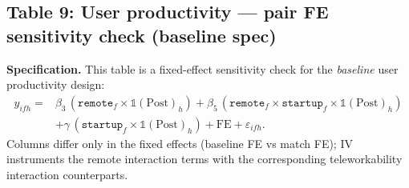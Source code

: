 \documentclass{article}
\newcommand{\cleanedresultsdir}{../../results/cleaned/tex}
\newcommand{\TableInput}[2][\linewidth]{}
\newcommand{\FloatNote}[1]{%
  \begingroup
    \captionsetup{style=noteflush}%
    \caption*{\textit{Notes:}~#1}%
  \endgroup
}
\begin{document}
\subsection*{Table 9: User productivity --- pair FE sensitivity check (baseline spec)}
\noindent \textbf{Specification.} This table is a fixed-effect sensitivity check for the \emph{baseline} user productivity design:
\begin{equation*}
\begin{aligned}
  y_{ifh} ={}&
  \beta_3\,(\texttt{remote}_f\times \mathds{1}(\text{Post})_h)
  + \beta_5\,(\texttt{remote}_f\times \texttt{startup}_f\times \mathds{1}(\text{Post})_h) \\
  &+ \gamma\,(\texttt{startup}_f\times \mathds{1}(\text{Post})_h)
  + \text{FE} + \varepsilon_{ifh}.
\end{aligned}
\end{equation*}
\noindent Columns differ only in the fixed effects (baseline FE vs match FE); IV instruments the remote interaction terms with the corresponding teleworkability interaction counterparts.
\begin{table}[H]\centering
  \caption{Pair FE sensitivity check}
  \TableInput{\cleanedresultsdir/llm_equity_pi_followups_pair_fe_quick.tex}
  \FloatNote{Columns (1)--(2) use the baseline fixed effects $\alpha_i+\alpha_f+\tau_h$ (individual, firm, half-year). Columns (3)--(4) replace individual and firm fixed effects with a firm$\times$individual fixed effect $\alpha_{if}$ plus half-year FE. ``Main remote effect'' corresponds to $\beta_3$ on $\texttt{Remote}\times\mathds{1}(\text{Post})$ (post remote effect for non-startups). ``Main startup effect'' corresponds to $\beta_5$ on $\texttt{Remote}\times\mathds{1}(\text{Post})\times\text{Startup}$ (incremental post remote effect for startups). The post remote effect for startups is the sum of these two rows. Standard errors are clustered by worker and reported in parentheses; *, **, *** denote $p<0.10, 0.05, 0.01$.}
\end{table}
\end{document}
